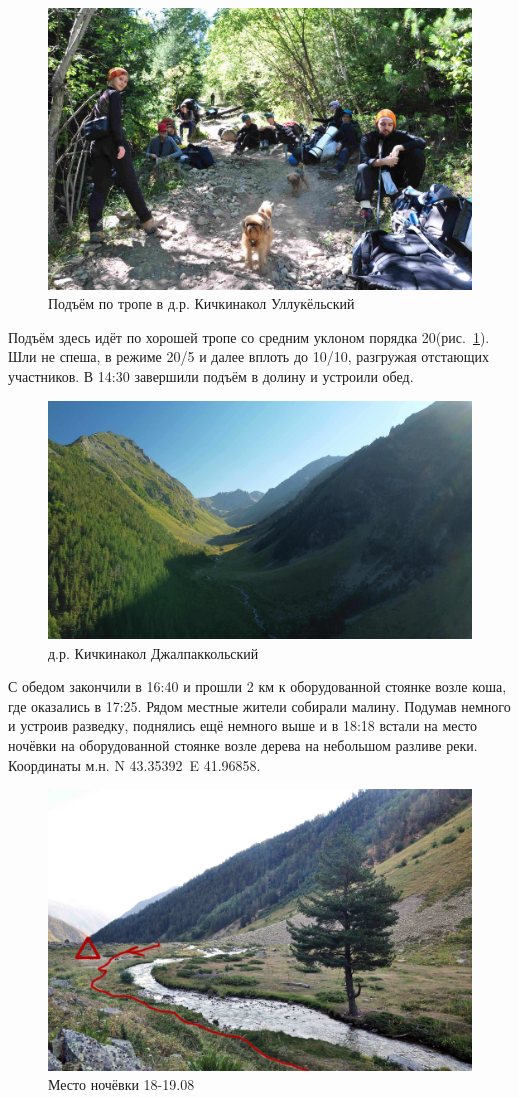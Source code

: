 \begin{figure}[h!]
	\centering
	\includegraphics[width=0.7\linewidth]{../pics/DSC_0436}
	\caption{Подъём по тропе в д.р. Кичкинакол Уллукёльский}
	\label{fig:DSC_0436}
\end{figure}

Подъём здесь идёт по хорошей тропе со средним уклоном порядка 20\degree (рис.~\ref{fig:DSC_0436}). Шли не спеша, в режиме 20/5 и далее вплоть до 10/10, разгружая отстающих участников. В 14:30 завершили подъём в долину и устроили обед.

\begin{figure}[h!]
	\centering
	\includegraphics[width=0.7\linewidth]{../pics/DJI_0805}
	\caption{д.р. Кичкинакол Джалпаккольский}
	\label{fig:kichkinakol}
\end{figure}

С обедом закончили в 16:40 и прошли 2 км к оборудованной стоянке возле коша, где оказались в 17:25. Рядом местные жители собирали малину. Подумав немного и устроив разведку, поднялись ещё немного выше и в 18:18 встали на место ночёвки на оборудованной стоянке возле дерева на небольшом разливе реки. Координаты м.н. N 43.35392\degree~E 41.96858\degree.
\begin{figure}[h!]
	\centering
	\includegraphics[width=0.7\linewidth]{../pics/camp_18}
	\caption{Место ночёвки 18-19.08}
	\label{fig:camp_18}
\end{figure}

\clearpage